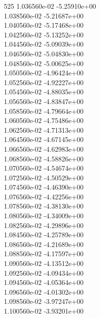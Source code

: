 525	1.036560e-02	-5.25910e+00	\\ 	1.038560e-02	-5.21687e+00	\\ 	1.040560e-02	-5.17468e+00	\\ 	1.042560e-02	-5.13252e+00	\\ 	1.044560e-02	-5.09039e+00	\\ 	1.046560e-02	-5.04830e+00	\\ 	1.048560e-02	-5.00625e+00	\\ 	1.050560e-02	-4.96424e+00	\\ 	1.052560e-02	-4.92227e+00	\\ 	1.054560e-02	-4.88035e+00	\\ 	1.056560e-02	-4.83847e+00	\\ 	1.058560e-02	-4.79664e+00	\\ 	1.060560e-02	-4.75486e+00	\\ 	1.062560e-02	-4.71313e+00	\\ 	1.064560e-02	-4.67145e+00	\\ 	1.066560e-02	-4.62983e+00	\\ 	1.068560e-02	-4.58826e+00	\\ 	1.070560e-02	-4.54674e+00	\\ 	1.072560e-02	-4.50529e+00	\\ 	1.074560e-02	-4.46390e+00	\\ 	1.076560e-02	-4.42256e+00	\\ 	1.078560e-02	-4.38130e+00	\\ 	1.080560e-02	-4.34009e+00	\\ 	1.082560e-02	-4.29896e+00	\\ 	1.084560e-02	-4.25789e+00	\\ 	1.086560e-02	-4.21689e+00	\\ 	1.088560e-02	-4.17597e+00	\\ 	1.090560e-02	-4.13512e+00	\\ 	1.092560e-02	-4.09434e+00	\\ 	1.094560e-02	-4.05364e+00	\\ 	1.096560e-02	-4.01302e+00	\\ 	1.098560e-02	-3.97247e+00	\\ 	1.100560e-02	-3.93201e+00	\\ \hline
